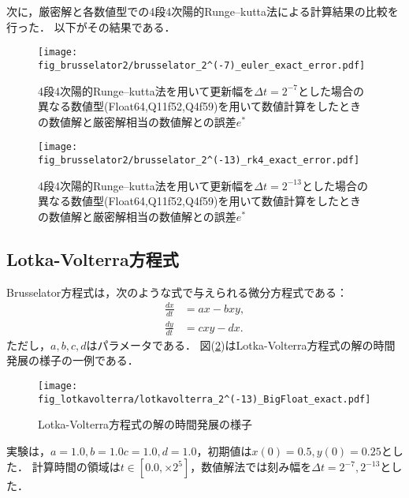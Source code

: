 次に，厳密解と各数値型での4段4次陽的Runge--kutta法による計算結果の比較を行った．
以下がその結果である．\\
\begin{figure}[H]
    \centering
    \begin{minipage}[b]{0.49\columnwidth}
        \centering
        \texttt{[image: fig\_brusselator2/brusselator\_2^(-7)\_euler\_exact\_error.pdf]}
        \caption{4段4次陽的Runge--kutta法を用いて更新幅を$\Delta t = 2^{-7}$とした場合の異なる数値型(Float64,Q11f52,Q4f59)を用いて数値計算をしたときの数値解と厳密解相当の数値解との誤差$e^{\ast}$}
        \label{fig:brusselator_2^(-7)_rk4_exact_error}
    \end{minipage}
    \begin{minipage}[b]{0.49\columnwidth}
        \centering
        \texttt{[image: fig\_brusselator2/brusselator\_2^(-13)\_rk4\_exact\_error.pdf]}
        \caption{4段4次陽的Runge--kutta法を用いて更新幅を$\Delta t =  2^{-13}$とした場合の異なる数値型(Float64,Q11f52,Q4f59)を用いて数値計算をしたときの数値解と厳密解相当の数値解との誤差$e^{\ast}$}
        \label{fig:brusselator_2^(-13)_rk4_exact_error}
    \end{minipage}
\end{figure}

\subsection{Lotka-Volterra方程式}
Brusselator方程式は，次のような式で与えられる微分方程式である：
\begin{align}
    \frac{dx}{dt} &=  ax - bxy,\\
    \frac{dy}{dt} &= cxy - dx.
\end{align}
ただし，$a,b,c,d$はパラメータである．
図(\ref{fig:lotkavolterra})はLotka-Volterra方程式の解の時間発展の様子の一例である．
\begin{figure}[H]
    \centering
    \begin{minipage}[b]{0.9\columnwidth}
            \texttt{[image: fig\_lotkavolterra/lotkavolterra\_2^(-13)\_BigFloat\_exact.pdf]}
    \end{minipage}
    \caption{Lotka-Volterra方程式の解の時間発展の様子}
    \label{fig:lotkavolterra}
\end{figure}
実験は，$a=1.0, b=1.0 c=1.0, d=1.0$，初期値は$x(0) = 0.5, y(0) = 0.25$とした．
計算時間の領域は$t \in [0.0, \times 2^5]$，数値解法では刻み幅を$\Delta t =  2^{-7}, 2^{-13}$とした．


